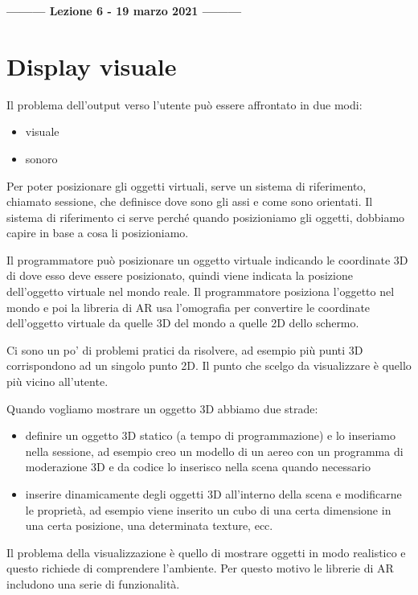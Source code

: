 \begin{center}
    \textbf{--------- Lezione 6 - 19 marzo 2021 ---------}
\end{center}

\section{Display visuale}
Il problema dell'output verso l'utente può essere affrontato in due modi: 
\begin{itemize}
    \item visuale
    \item sonoro
\end{itemize}

Per poter posizionare gli oggetti virtuali, serve un sistema di riferimento, chiamato sessione, che definisce dove sono gli assi e come sono orientati. 
Il sistema di riferimento ci serve perché quando posizioniamo gli oggetti, dobbiamo capire in base a cosa li posizioniamo. 

Il programmatore può posizionare un oggetto virtuale indicando le coordinate 3D di dove esso deve essere posizionato, quindi viene indicata la posizione dell'oggetto virtuale nel mondo reale.
Il programmatore posiziona l'oggetto nel mondo e poi la libreria di AR usa l'omografia per convertire le coordinate dell'oggetto virtuale da quelle 3D del mondo a quelle 2D dello schermo. 

Ci sono un po' di problemi pratici da risolvere, ad esempio più punti 3D corrispondono ad un singolo punto 2D. Il punto che scelgo da visualizzare è quello più vicino all'utente.

Quando vogliamo mostrare un oggetto 3D abbiamo due strade:
\begin{itemize}
    \item definire un oggetto 3D statico (a tempo di programmazione) e lo inseriamo nella sessione, ad esempio creo un modello di un aereo con un programma di moderazione 3D e da codice lo inserisco nella scena quando necessario
    \item inserire dinamicamente degli oggetti 3D all'interno della scena e modificarne le proprietà, ad esempio viene inserito un cubo di una certa dimensione in una certa posizione, una determinata texture, ecc.
\end{itemize}

Il problema della visualizzazione è quello di mostrare oggetti in modo realistico e questo richiede di comprendere l'ambiente. Per questo motivo le librerie di AR includono una serie di funzionalità.

